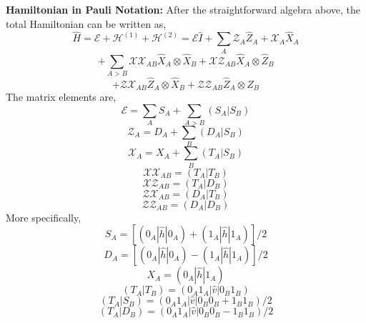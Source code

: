 \textbf{Hamiltonian in Pauli Notation:} After the straightforward
algebra above, the total Hamiltonian can be written as,
\begin{equation}
\label{eq:H_N}
\hat H
=
\mathcal{E}
+
\mathcal{H}^{(1)}
+
\mathcal{H}^{(2)}
=
\mathcal{E} \hat I 
+ 
\sum_{A}
\mathcal{Z}_{A}
\hat Z_{A}
+
\mathcal{X}_{A}
\hat X_{A}
\end{equation}
\[
+
\sum_{A > B}
\mathcal{XX}_{AB}
\hat X_{A} \otimes \hat X_{B}
+
\mathcal{XZ}_{AB}
\hat X_{A} \otimes \hat Z_{B}
\]
\[
+
\mathcal{ZX}_{AB}
\hat Z_{A} \otimes \hat X_{B}
+
\mathcal{ZZ}_{AB}
\hat Z_{A} \otimes \hat Z_{B}
\]
The matrix elements are,
\begin{equation}
\mathcal{E}
=
\sum_{A}
S_{A}
+
\sum_{A>B}
(S_A | S_B)
\end{equation}
\begin{equation}
\mathcal{Z}_{A}
=
D_{A}
+
\sum_{B}
(D_{A} | S_{B})
\end{equation}
\begin{equation}
\mathcal{X}_{A} 
=
X_{A}
+
\sum_{B}
(T_{A} | S_{B})
\end{equation}
\begin{equation}
\mathcal{XX}_{AB}
=
(T_{A} | T_{B})
\end{equation}
\begin{equation}
\mathcal{XZ}_{AB}
=
(T_{A} | D_{B})
\end{equation}
\begin{equation}
\mathcal{ZX}_{AB}
=
(D_{A} | T_{B})
\end{equation}
\begin{equation}
\mathcal{ZZ}_{AB}
=
(D_{A} | D_{B})
\end{equation}
More specifically,
\begin{equation}
S_{A} = 
\left [
(0_A | \hat h |0_A)
+
(1_A | \hat h |1_A)
\right ] / 2
\end{equation}
\begin{equation}
D_{A} = 
\left [
(0_A | \hat h |0_A)
-
(1_A | \hat h |1_A)
\right ] / 2
\end{equation}
\begin{equation}
X_{A} =
(0_A | \hat h | 1_A)
\end{equation}
\begin{equation}
(T_A | T_B) 
=
(0_A 1_A | \hat v | 0_B 1_B)
\end{equation}
\begin{equation}
(T_A | S_B) 
=
(0_A 1_A | \hat v | 0_B 0_B + 1_B 1_B) / 2
\end{equation}
\begin{equation}
(T_A | D_B) 
=
(0_A 1_A | \hat v | 0_B 0_B - 1_B 1_B) / 2
\end{equation}
